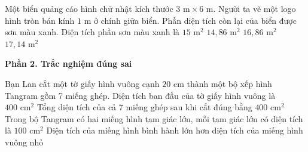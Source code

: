 \begin{ex} %
Một biển quảng cáo hình chữ nhật kích thước $3\text{ m} \times 6\text{ m}$. Người ta vẽ một logo hình tròn bán kính $1\text{ m}$ ở chính giữa biển. Phần diện tích còn lại của biển được sơn màu xanh. Diện tích phần sơn màu xanh là
\choice
{$15\text{ m}^2$}
{\True $14{,}86\text{ m}^2$}
{$16{,}86\text{ m}^2$}
{$17{,}14\text{ m}^2$}
\end{ex}

\textbf{Phần 2. Trắc nghiệm đúng sai}

\begin{ex} %
Bạn Lan cắt một tờ giấy hình vuông cạnh $20\text{ cm}$ thành một bộ xếp hình Tangram gồm 7 miếng ghép.
\choiceTF
{\True Diện tích ban đầu của tờ giấy hình vuông là $400\text{ cm}^2$}
{\True Tổng diện tích của cả 7 miếng ghép sau khi cắt đúng bằng $400\text{ cm}^2$}
{\True Trong bộ Tangram có hai miếng hình tam giác lớn, mỗi tam giác lớn có diện tích là $100\text{ cm}^2$}
{Diện tích của miếng hình bình hành lớn hơn diện tích của miếng hình vuông nhỏ}
\end{ex}

